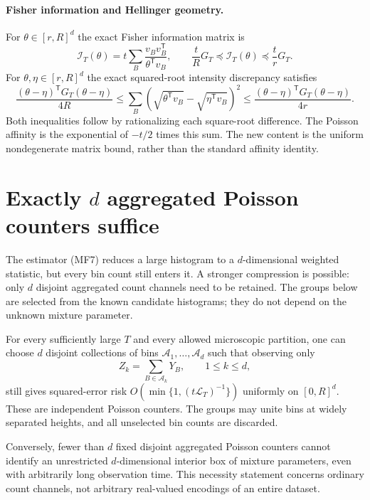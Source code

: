 \paragraph{Fisher information and Hellinger geometry.}
For $\theta\in[r,R]^d$ the exact Fisher information matrix is
\[
 \mathcal I_T(\theta)
 =t\sum_B\frac{v_Bv_B^{\mathsf T}}{\theta^{\mathsf T}v_B},
 \qquad
 \frac tR G_T\preceq\mathcal I_T(\theta)\preceq\frac trG_T.
\tag{MF11}
\]
For $\theta,\eta\in[r,R]^d$ the exact squared-root intensity discrepancy
satisfies
\[
 \frac{(\theta-\eta)^{\mathsf T}G_T(\theta-\eta)}{4R}
 \le \sum_B(\sqrt{\theta^{\mathsf T}v_B}
                 -\sqrt{\eta^{\mathsf T}v_B})^2
 \le\frac{(\theta-\eta)^{\mathsf T}G_T(\theta-\eta)}{4r}.
\tag{MF12}
\]
Both inequalities follow by rationalizing each square-root difference.
The Poisson affinity is the exponential of $-t/2$ times this sum.
The new content is the uniform nondegenerate matrix bound, rather than
the standard affinity identity.

\section{Exactly \texorpdfstring{$d$}{d} aggregated Poisson counters suffice}

The estimator (MF7) reduces a large histogram to a $d$-dimensional weighted
statistic, but every bin count still enters it.  A stronger compression is
possible: only $d$ disjoint aggregated count channels need to be retained.
The groups below are selected from the known candidate histograms; they do
not depend on the unknown mixture parameter.

\begin{theorem}\label{mix:thm:counters}
For every sufficiently large $T$ and every allowed microscopic partition,
one can choose $d$ disjoint collections of bins
$\mathcal A_1,\ldots,\mathcal A_d$ such that observing only
\[
 Z_k=\sum_{B\in\mathcal A_k}Y_B,\qquad 1\le k\le d,
\tag{MF14}
\]
still gives squared-error risk
$O(\min\{1,(t\mathcal L_T)^{-1}\})$ uniformly on $[0,R]^d$.
These are independent Poisson counters.  The groups may unite bins at
widely separated heights, and all unselected bin counts are discarded.

Conversely, fewer than $d$ fixed disjoint aggregated Poisson counters
cannot identify an unrestricted $d$-dimensional interior box of mixture
parameters, even with arbitrarily long observation time.  This necessity
statement concerns ordinary count channels, not arbitrary real-valued
encodings of an entire dataset.
\end{theorem}

